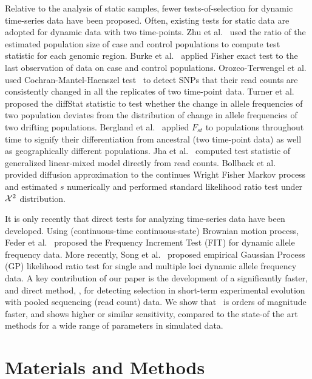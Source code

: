 \documentclass[11pt]{article}
\def\comale{\text{{\sc Comale}}}
\begin{document}
Relative to the analysis of static samples, fewer tests-of-selection
for dynamic time-series data have been proposed. Often, existing tests
for static data are adopted for dynamic data with two time-points. Zhu
et al.~\cite{zhou2011experimental} used the ratio of the estimated
population size of case and control populations to compute test
statistic for each genomic region. Burke et al.~\cite{burke2010genome}
applied Fisher exact test to the last observation of data on case and
control populations.  Orozco-Terwengel et
al.~\cite{orozco2012adaptation} used Cochran-Mantel-Haenszel
test~\cite{agresti2011categorical} to detect SNPs that their read
counts are consistently changed in all the replicates of two
time-point data.  Turner et al.~\cite{turner2011population} proposed
the diffStat statistic to test whether the change in allele
frequencies of two population deviates from the distribution of change
in allele frequencies of two drifting populations.  Bergland et
al.~\cite{bergland2014genomic} applied $F_{st}$ to populations
throughout time to signify their differentiation from ancestral (two
time-point data) as well as geographically different populations.  Jha
et al.~\cite{jha2015whole} computed test statistic of generalized
linear-mixed model directly from read counts.  Bollback et
al.~\cite{bollback2008estimation} provided diffusion approximation to
the continues Wright Fisher Markov process and estimated $s$
numerically and performed standard likelihood ratio test under ${\cal X}^2$
distribution. 

It is only recently that direct tests for analyzing time-series data
have been developed. Using (continuous-time continuous-state) Brownian
motion process, Feder et al.~\cite{feder2014Identifying} proposed the
Frequency Increment Test (FIT) for dynamic allele frequency data. More
recently, Song et al.~\cite{Terhorst2015Multi} proposed empirical
Gaussian Process (GP) likelihood ratio test for single and multiple
loci dynamic allele frequency data. A key contribution of our paper is
the development of a significantly faster, and direct method, \comale,
for detecting selection in short-term experimental evolution with
pooled sequencing (read count) data.  We show that \comale\ is orders
of magnitude faster, and shows higher or similar sensitivity, compared
to the state-of the art methods for a wide range of parameters in
simulated data.  


\section{Materials and Methods}
\end{document}
